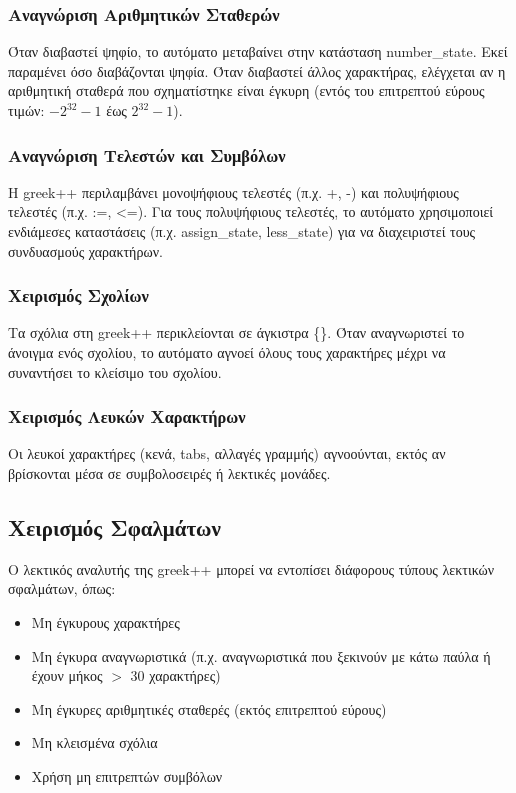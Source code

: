\documentclass[12pt,a4paper]{article}
\begin{document}
            \subsubsection{Αναγνώριση Αριθμητικών Σταθερών}
                Όταν διαβαστεί ψηφίο, το αυτόματο μεταβαίνει στην κατάσταση number\_state. Εκεί παραμένει όσο διαβάζονται ψηφία. Όταν διαβαστεί άλλος χαρακτήρας, ελέγχεται αν η αριθμητική σταθερά που σχηματίστηκε είναι έγκυρη (εντός του επιτρεπτού εύρους τιμών: $-2^{32}-1$ έως $2^{32}-1$).

            \subsubsection{Αναγνώριση Τελεστών και Συμβόλων}
                Η greek++ περιλαμβάνει μονοψήφιους τελεστές (π.χ. +, -) και πολυψήφιους τελεστές (π.χ. :=, <=). Για τους πολυψήφιους τελεστές, το αυτόματο χρησιμοποιεί ενδιάμεσες καταστάσεις (π.χ. assign\_state, less\_state) για να διαχειριστεί τους συνδυασμούς χαρακτήρων.

            \subsubsection{Χειρισμός Σχολίων}
                Τα σχόλια στη greek++ περικλείονται σε άγκιστρα \{\}. Όταν αναγνωριστεί το άνοιγμα ενός σχολίου, το αυτόματο αγνοεί όλους τους χαρακτήρες μέχρι να συναντήσει το κλείσιμο του σχολίου.

            \subsubsection{Χειρισμός Λευκών Χαρακτήρων}
                Οι λευκοί χαρακτήρες (κενά, tabs, αλλαγές γραμμής) αγνοούνται, εκτός αν βρίσκονται μέσα σε συμβολοσειρές ή λεκτικές μονάδες.

        \subsection{Χειρισμός Σφαλμάτων}
        Ο λεκτικός αναλυτής της greek++ μπορεί να εντοπίσει διάφορους τύπους λεκτικών σφαλμάτων, όπως:
        \begin{itemize}
            \item Μη έγκυρους χαρακτήρες
            \item Μη έγκυρα αναγνωριστικά (π.χ. αναγνωριστικά που ξεκινούν με κάτω παύλα ή έχουν μήκος $>$ 30 χαρακτήρες)
            \item Μη έγκυρες αριθμητικές σταθερές (εκτός επιτρεπτού εύρους)
            \item Μη κλεισμένα σχόλια
            \item Χρήση μη επιτρεπτών συμβόλων
        \end{itemize}
\end{document}
